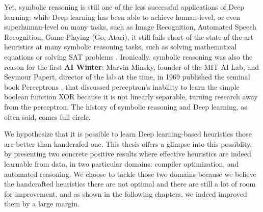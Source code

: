 Yet, symbolic reasoning is still one of the less successful applications of Deep learning: while Deep learning has been able to achieve human-level, or even superhuman-level on many tasks, such as Image Recognition, Automated Speech Recognition, Game Playing (Go, Atari), it still fails short of the state-of-the-art heuristics at many symbolic reasoning tasks, such as solving mathematical equations \cite{lample2019deep} or solving SAT problems \cite{neuralsat}. Ironically, symbolic reasoning was also the reason for the first \textbf{AI Winter}: Marvin Minsky, founder of the MIT AI Lab, and Seymour Papert, director of the lab at the time, in 1969 published the seminal book Perceptrons \cite{perceptrons}, that discussed perceptron's inability to learn the simple boolean function XOR because it is not linearly separable, turning research away from the perceptron. The history of symbolic reasoning and Deep learning, as often said, comes full circle.

We hypothesize that it is possible to learn Deep learning-based heuristics those are better than handcrafed one. This thesis offers a glimpse into this possiblity, by presenting two concrete positive results where effective heuristics are indeed learnable from data, in two particular domains: compiler optimization, and automated reasoning. We choose to tackle those two domains because we believe the handcrafted heuristics there are not optimal and there are still a lot of room for improvement, and as shown in the following chapters, we indeed improved them by a large margin.












